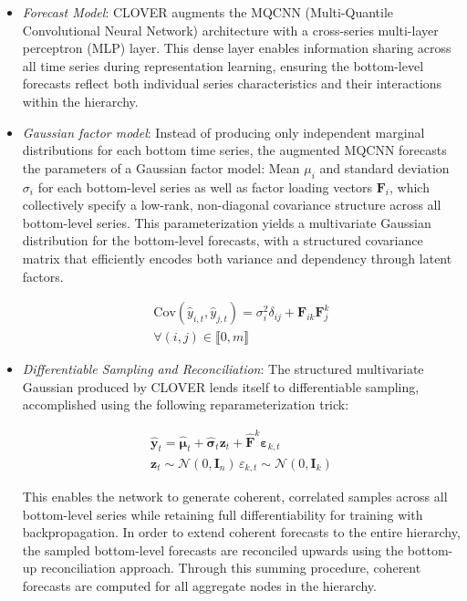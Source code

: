 \documentclass[letterpaper]{article}
\begin{document}
\begin{itemize}
     
\item \textit{Forecast Model}: CLOVER augments the MQCNN (Multi-Quantile Convolutional Neural Network) \cite{MQCNN} architecture with a cross-series multi-layer perceptron (MLP) layer. 
This dense layer enables information sharing across all time series during representation learning, ensuring the bottom-level forecasts reflect both individual series characteristics and their interactions within the hierarchy.


\item \textit{Gaussian factor model}: Instead of producing only independent marginal distributions for each bottom time series, the augmented MQCNN forecasts the parameters of a Gaussian factor model: Mean $\mu_i$ and standard deviation $\sigma_i$ for each bottom-level series as well as factor loading vectors $\mathbf{F}_i$, which collectively specify a low-rank, non-diagonal covariance structure across all bottom-level series. 
This parameterization yields a multivariate Gaussian distribution for the bottom-level forecasts, with a structured covariance matrix that efficiently encodes both variance and dependency through latent factors.

\begin{multline}
    \mathrm{Cov}(\hat{y}_{i,t}, \hat{y}_{j,t}) = \sigma^2_i\delta_{ij} + \mathbf{F}_{ik} \mathbf{F}_{j}^k \\ 
    \forall (i,j) \in  \llbracket 0, m \rrbracket 
\end{multline}


\item \textit{Differentiable Sampling and Reconciliation}:
The structured multivariate Gaussian produced by CLOVER lends itself to differentiable sampling, accomplished using the following reparameterization trick: 

\begin{multline}
    \hat{\mathbf{y}}_t = \hat{\mathbf{\mu}}_t + \mathbf{\hat{\sigma}}_t \mathbf{z}_t + \hat{\mathbf{F}}^k\mathbf{\varepsilon}_{k,t}\\
    \mathbf{z}_t \sim \mathcal{N}(0,\mathbf{I}_n) \,\varepsilon_{k,t} \sim \mathcal{N}(0,\mathbf{I}_k)
\end{multline}

This enables the network to generate coherent, correlated samples across all bottom-level series while retaining full differentiability for training with backpropagation. 
In order to extend coherent forecasts to the entire hierarchy, the sampled bottom-level forecasts are reconciled upwards using the bottom-up reconciliation approach. 
Through this summing procedure, coherent forecasts are computed for all aggregate nodes in the hierarchy.


\end{itemize}
\end{document}
